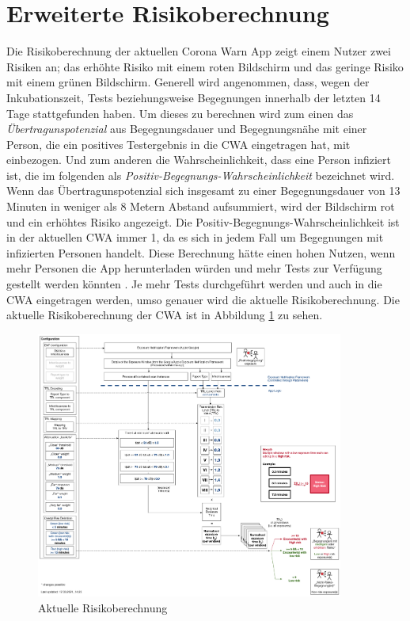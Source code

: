 \documentclass[conference,compsoc]{IEEEtran}
\begin{document}
\section{Erweiterte Risikoberechnung} \label{Erweiterte_Risikoberechnung}

Die Risikoberechnung der aktuellen Corona Warn App zeigt einem Nutzer zwei Risiken an; 
das erhöhte Risiko mit einem roten Bildschirm und das geringe Risiko mit einem grünen Bildschirm. 
Generell wird angenommen, dass, wegen der Inkubationszeit, Tests beziehungsweise Begegnungen innerhalb der letzten 14 Tage stattgefunden haben.
Um dieses zu berechnen wird zum einen das \textit{Übertragunspotenzial} aus Begegnungsdauer und Begegnungsnähe mit einer Person, 
die ein positives Testergebnis in die CWA eingetragen hat, mit einbezogen. Und zum anderen die Wahrscheinlichkeit, 
dass eine Person infiziert ist, die im folgenden als \textit{Positiv-Begegnungs-Wahrscheinlichkeit} bezeichnet wird.
Wenn das Übertragunspotenzial sich insgesamt zu einer Begegnungsdauer von 13 Minuten in weniger als 8 Metern Abstand aufsummiert, 
wird der Bildschirm rot und ein erhöhtes Risiko angezeigt. Die Positiv-Begegnungs-Wahrscheinlichkeit ist in der aktuellen CWA immer 1, 
da es sich in jedem Fall um Begegnungen mit infizierten Personen handelt.
Diese Berechnung hätte einen hohen Nutzen, wenn mehr Personen die App herunterladen würden und mehr Tests zur Verfügung gestellt werden könnten \cite{}.
Je mehr Tests durchgeführt werden und auch in die CWA eingetragen werden, umso genauer wird die aktuelle Risikoberechnung. 
Die aktuelle Risikoberechnung der CWA ist in Abbildung \ref{Risikoberechnung_Abbildung} zu sehen.

\begin{figure}[h]
	\centering
	\includegraphics[width=0.9\textwidth]{"Aktuelle_Risikoberechnung"}
	\caption{Aktuelle Risikoberechnung \cite{Risikoberechnung}}
	\label{Risikoberechnung_Abbildung}
\end{figure}
\end{document}
